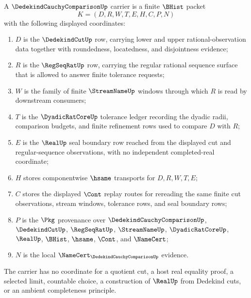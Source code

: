 \begin{definition}
\label{def:dedekind-cauchy-comparison-carrier}
A $\DedekindCauchyComparisonUp$ carrier is a finite $\BHist$ packet
$$
K=(D,R,W,T,E,H,C,P,N)
$$
with the following displayed coordinates:
\begin{enumerate}
\item $D$ is the $\DedekindCutUp$ row, carrying lower and upper rational-observation data together with roundedness, locatedness, and disjointness evidence;
\item $R$ is the $\RegSeqRatUp$ row, carrying the regular rational sequence surface that is allowed to answer finite tolerance requests;
\item $W$ is the family of finite $\StreamNameUp$ windows through which $R$ is read by downstream consumers;
\item $T$ is the $\DyadicRatCoreUp$ tolerance ledger recording the dyadic radii, comparison budgets, and finite refinement rows used to compare $D$ with $R$;
\item $E$ is the $\RealUp$ seal boundary row reached from the displayed cut and regular-sequence observations, with no independent completed-real coordinate;
\item $H$ stores componentwise $\hsame$ transports for $D,R,W,T,E$;
\item $C$ stores the displayed $\Cont$ replay routes for rereading the same finite cut observations, stream windows, tolerance rows, and seal boundary rows;
\item $P$ is the $\Pkg$ provenance over $\DedekindCauchyComparisonUp$, $\DedekindCutUp$, $\RegSeqRatUp$, $\StreamNameUp$, $\DyadicRatCoreUp$, $\RealUp$, $\BHist$, $\hsame$, $\Cont$, and $\NameCert$;
\item $N$ is the local $\NameCert_{\DedekindCauchyComparisonUp}$ evidence.
\end{enumerate}
The carrier has no coordinate for a quotient cut, a host real equality proof, a selected limit, countable choice, a construction of $\RealUp$ from Dedekind cuts, or an ambient completeness principle.
\end{definition}

